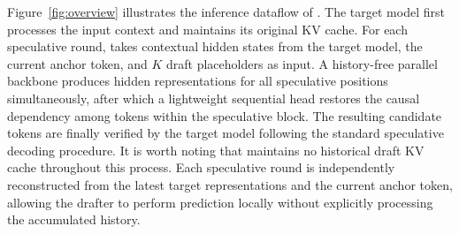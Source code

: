 Figure~\ref{fig:overview} illustrates the inference dataflow of \we. The target model first processes the input context and maintains its original KV cache. For each speculative round, \we takes contextual hidden states from the target model, the current anchor token, and \(K\) draft placeholders as input. A history-free parallel backbone produces hidden representations for all speculative positions simultaneously, after which a lightweight sequential head restores the causal dependency among tokens within the speculative block. The resulting candidate tokens are finally verified by the target model following the standard speculative decoding procedure. It is worth noting that \we maintains no historical draft KV cache throughout this process. Each speculative round is independently reconstructed from the latest target representations and the current anchor token, allowing the drafter to perform prediction locally without explicitly processing the accumulated history.





